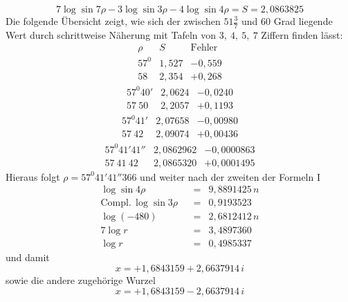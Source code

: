 \[
7\log\sin7\rho-3\log\sin3\rho-4\log\sin4\rho=S=2{,}0863825
\]
Die folgende Übersicht zeigt, wie sich der zwischen $51\frac37$ und $60$ Grad liegende Wert durch schrittweise Näherung mit Tafeln von $3,\ 4,\ 5,\ 7$ Ziffern finden lässt:
\[
\begin{array}{c|c|c}
\rho&S&\text{Fehler}\\
57^{0}&1{,}527&-0{,}559\\
58&2{,}354&+0{,}268
\end{array}
\]
\[
\begin{array}{c|c|c}
57^{0}40'&2{,}0624&-0{,}0240\\
57\ 50&2{,}2057&+0{,}1193
\end{array}
\]
\[
\begin{array}{c|c|c}
57^{0}41'&2{,}07658&-0{,}00980\\
57\ 42&2{,}09074&+0{,}00436
\end{array}
\]
\[
\begin{array}{c|c|c}
57^{0}41'41''&2{,}0862962&-0{,}0000863\\
57\ 41\ 42&2{,}0865320&+0{,}0001495
\end{array}
\]
Hieraus folgt $\rho=57^{0}41'41''366$ und weiter nach der zweiten der Formeln I
\[
\begin{array}{lrcl}
\log\sin4\rho&&=&9{,}8891425\,n\\
\mathrm{Compl.}\,\log\sin3\rho&&=&0{,}9193523\\
\log(-480)&&=&2{,}6812412\,n\\\hline
7\log r&&=&3{,}4897360\\
\log r&&=&0{,}4985337
\end{array}
\]
und damit
\[
x=+1{,}6843159+2{,}6637914\,i
\]
sowie die andere zugehörige Wurzel
\[
x=+1{,}6843159-2{,}6637914\,i
\]

